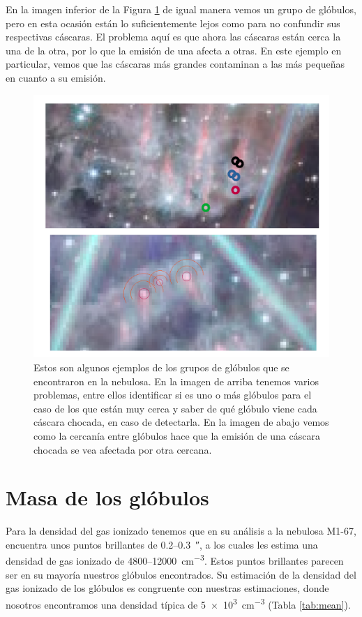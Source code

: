 \documentclass{book}
\begin{document}
En la imagen inferior de la Figura \ref{globule_group} de igual manera vemos un grupo de glóbulos, pero en esta ocasión están lo suficientemente lejos como para no confundir sus respectivas cáscaras. El problema aquí es que ahora las cáscaras están cerca la una de la otra, por lo que la emisión de una afecta a otras. En este ejemplo en particular, vemos que las cáscaras más grandes contaminan a las más pequeñas en cuanto a su emisión.\\

\begin{figure}[htb]
    \centering
    \includegraphics[width=\textwidth]{imagenes_corregidas/n_gruops_globules.pdf}
    \caption{Estos son algunos ejemplos de los grupos de glóbulos que se encontraron en la nebulosa. En la imagen de arriba tenemos varios problemas, entre ellos identificar si es uno o más glóbulos para el caso de los que están muy cerca y saber de qué glóbulo viene cada cáscara chocada, en caso de detectarla. En la imagen de abajo vemos como la cercanía entre glóbulos hace que la emisión de una cáscara chocada se vea afectada por otra cercana.}
    \label{globule_group}
\end{figure}

\section{Masa de los glóbulos}\label{app:masa_glo}

Para la densidad del gas ionizado tenemos que \cite{Grosdidier:1998} en su análisis a la nebulosa M1-67, encuentra unos puntos brillantes de 0.2--\SI{0.3}{\arcsecond}, a los cuales les estima una densidad de gas ionizado de 4800--\SI{12 000}{cm^{-3}}. Estos puntos brillantes parecen ser en su mayoría nuestros glóbulos encontrados. Su estimación de la densidad del gas ionizado de los glóbulos es congruente con nuestras estimaciones, donde nosotros encontramos una densidad típica de \SI{5e3}{cm^{-3}} (Tabla \ref{tab:mean}).  
\end{document}
